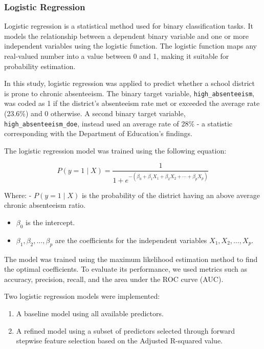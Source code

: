 \documentclass[
  11pt,
]{article}
\begin{document}
\subsubsection{Logistic Regression}\label{logistic-regression}

Logistic regression is a statistical method used for binary
classification tasks. It models the relationship between a dependent
binary variable and one or more independent variables using the logistic
function. The logistic function maps any real-valued number into a value
between 0 and 1, making it suitable for probability estimation.

In this study, logistic regression was applied to predict whether a
school district is prone to chronic absenteeism. The binary target
variable, \texttt{high\_absenteeism}, was coded as 1 if the district's
absenteeism rate met or exceeded the average rate (23.6\%) and 0
otherwise. A second binary target variable,
\texttt{high\_absenteeism\_doe}, instead used an average rate of 28\% -
a statistic corresponding with the Department of Education's findings.

The logistic regression model was trained using the following equation:

\[
P(y = 1 \mid X) = \frac{1}{1 + e^{-(\beta_0 + \beta_1 X_1 + \beta_2 X_2 + \cdots + \beta_p X_p)}}
\]

Where: - \(P(y = 1 \mid X)\) is the probability of the district having
an above average chronic absenteeism ratio.

\begin{itemize}
\item
  \(\beta_0\) is the intercept.
\item
  \(\beta_1, \beta_2, \ldots, \beta_p\) are the coefficients for the
  independent variables \(X_1, X_2, \ldots, X_p\).
\end{itemize}

The model was trained using the maximum likelihood estimation method to
find the optimal coefficients. To evaluate its performance, we used
metrics such as accuracy, precision, recall, and the area under the ROC
curve (AUC).

Two logistic regression models were implemented:

\begin{enumerate}
\def\labelenumi{\arabic{enumi}.}
\item
  A baseline model using all available predictors.
\item
  A refined model using a subset of predictors selected through forward
  stepwise feature selection based on the Adjusted R-squared value.
\end{enumerate}
\end{document}

